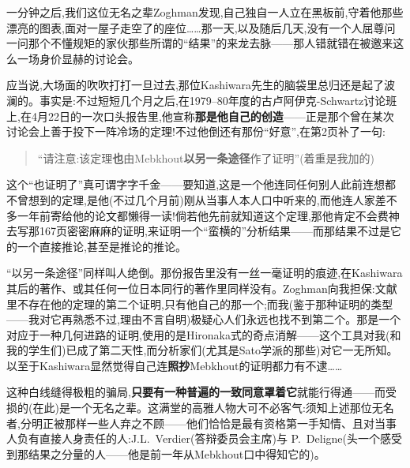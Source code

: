 \noindent 一分钟之后,我们这位无名之辈Zoghman发现,自己独自一人立在黑板前,守着他那些漂亮的图表,面对一屋子走空了的座位……那一天,以及随后几天,没有一个人屈尊问一问那个不懂规矩的家伙那些所谓的“结果”的来龙去脉——那人错就错在被邀来这么一场身价显赫的讨论会。

\noindent 应当说,大场面的吹吹打打一旦过去,那位Kashiwara先生的脑袋里总归还是起了波澜的。事实是:不过短短几个月之后,在1979--80年度的古卢阿伊克-Schwartz讨论班上,在4月22日的一次口头报告里,他宣称\textbf{那是他自己的创造}——正是那个\dmark{}曾在某次讨论会上善于投下一阵冷场的定理!不过他倒还有那份“好意”,在第2页补了一句:

\begin{quote}
“请注意:该定理\textbf{也}由Mebkhout\textbf{以另一条途径}作了证明”(着重是我加的)
\end{quote}

\noindent 这个“也证明了”真可谓字字千金——要知道,这是一个他连同任何别人此前连想都不曾想到的定理,是他(不过几个月前)刚从当事人本人口中听来的,而他连人家差不多一年前寄给他的论文都懒得一读!倘若他先前就知道这个定理,那他肯定不会费神去写那167页密密麻麻的证明,来证明一个“蛮横的”分析结果——而那结果不过是它的一个直接推论,甚至是推论的推论。

\noindent “以另一条途径”同样叫人绝倒。那份报告里没有一丝一毫证明的痕迹,在Kashiwara其后的著作、或其任何一位日本同行的著作里同样没有。Zoghman向我担保:文献里不存在他的定理的第二个证明,只有他自己的那一个;而我(鉴于那种证明的类型——我对它再熟悉不过,理由不言自明)极疑心人们永远也找不到第二个。那是一个对应于一种几何进路的证明,使用的是Hironaka式的奇点消解——这个工具对我(和我的学生们)已成了第二天性,而分析家们(尤其是Sato学派的那些)对它一无所知。以至于Kashiwara显然觉得自己连\textbf{照抄}Mebkhout的证明都力有不逮……

\noindent 这种白线缝得极粗的骗局,\textbf{只要有一种普遍的一致同意罩着它}就能行得通——而受损的(在此)是一个无名之辈。这满堂的高雅人物大可不必客气:须知上述那位\dmark{}无名者,分明正被那样一些人弃之不顾——他们恰恰是最有资格第一手知情、且对当事人负有直接人身责任的人:J.L.~Verdier(答辩委员会主席)与 P.~Deligne(头一个感受到那结果之分量的人——他是前一年从Mebkhout口中得知它的)。

